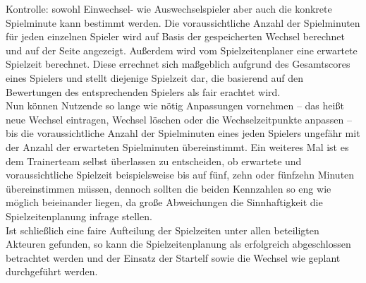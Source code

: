 Kontrolle: sowohl Einwechsel- wie Auswechselspieler aber auch die konkrete 
Spielminute kann bestimmt werden. Die voraussichtliche Anzahl der Spielminuten für 
jeden einzelnen Spieler wird auf Basis der gespeicherten Wechsel berechnet und auf 
der Seite angezeigt. Außerdem wird vom Spielzeitenplaner eine erwartete Spielzeit 
berechnet. Diese errechnet sich maßgeblich aufgrund des Gesamtscores eines Spielers 
und stellt diejenige Spielzeit dar, die basierend auf den Bewertungen des 
entsprechenden Spielers als fair erachtet wird. \\ 
Nun können Nutzende so lange wie nötig Anpassungen vornehmen -- das heißt neue 
Wechsel eintragen, Wechsel löschen oder die Wechselzeitpunkte anpassen -- bis 
die voraussichtliche Anzahl der Spielminuten eines jeden Spielers ungefähr mit der 
Anzahl der erwarteten Spielminuten übereinstimmt. Ein weiteres Mal ist es dem 
Trainerteam selbst überlassen zu entscheiden, ob erwartete und voraussichtliche 
Spielzeit beispielsweise bis auf fünf, zehn oder fünfzehn Minuten übereinstimmen 
müssen, dennoch sollten die beiden Kennzahlen so eng wie möglich beieinander 
liegen, da große Abweichungen die Sinnhaftigkeit die Spielzeitenplanung infrage 
stellen. \\ 
Ist schließlich eine faire Aufteilung der Spielzeiten unter allen beteiligten 
Akteuren gefunden, so kann die Spielzeitenplanung als erfolgreich abgeschlossen 
betrachtet werden und der Einsatz der Startelf sowie die Wechsel wie geplant 
durchgeführt werden. 

